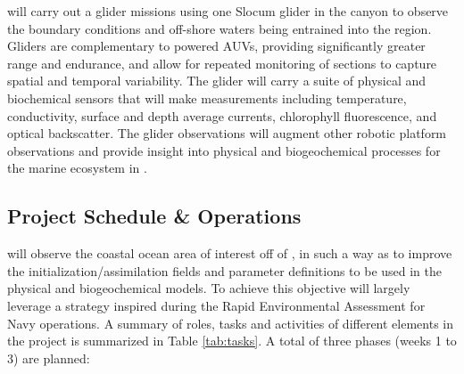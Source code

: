 \soc will carry out a glider missions using one Slocum glider in the
\naz canyon to observe the boundary conditions and off-shore waters
being entrained into the region. %
Gliders are complementary to powered AUVs, providing significantly
greater range and endurance, and allow for repeated monitoring of
sections to capture spatial and temporal
variability. %
The \soc glider will carry a suite of physical and biochemical sensors
that will make measurements including temperature, conductivity,
surface and depth average currents, chlorophyll fluorescence, and
optical backscatter. The glider observations will augment other
robotic platform observations and provide insight into physical and
biogeochemical processes for the marine ecosystem in
\naze. %

  
\subsection{Project Schedule \& Operations}
\label{sec:atsea-ops}

\proj will observe the coastal ocean area of interest off of \naze, in
such a way as to improve the initialization/assimilation fields and
parameter definitions to be used in the physical and biogeochemical
models. To achieve this objective \proj will largely leverage a
strategy inspired during the Rapid Environmental Assessment for Navy
operations. A summary of roles, tasks and activities of different
elements in the project is summarized in Table \ref{tab:tasks}. A
total of three phases (weeks 1 to 3) are planned:

